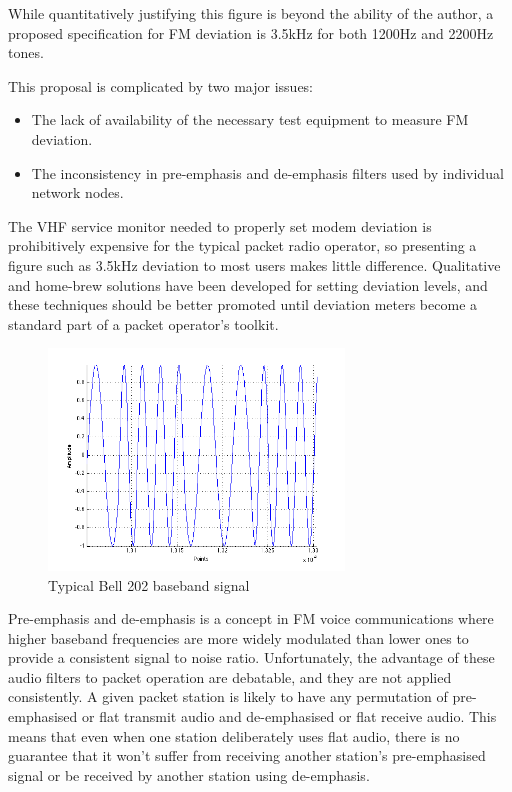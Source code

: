 \documentclass[12pt,letterpaper]{article}
\begin{document}
While quantitatively justifying this figure is beyond the ability of the
author, a proposed specification for FM deviation is 3.5kHz for both
1200Hz and 2200Hz tones\cite{millerinterview}.

This proposal is complicated by two major issues: 
\begin{itemize}
	\item The lack of availability of the necessary 
		test equipment to measure FM deviation.
	\item The inconsistency in pre-emphasis and de-emphasis filters
		used by individual network nodes.
\end{itemize}

The VHF service monitor needed to properly set modem deviation is prohibitively
expensive for the typical packet radio operator, so presenting a figure 
such as 3.5kHz deviation to most users makes little difference.
Qualitative and home-brew solutions have been developed
for setting deviation levels\cite{n8urdev},
and these techniques should be better promoted until 
deviation meters become a standard part of a packet operator's toolkit. 

\begin{figure}
	\centering
	\includegraphics[width=0.7\textwidth]{src/bell202sample}
	\caption{Typical Bell 202 baseband signal}
	\label{fig:bell202sample}
\end{figure}

Pre-emphasis and de-emphasis is a concept in FM voice communications where
higher baseband frequencies are more widely modulated than lower ones
to provide a consistent signal to noise ratio.
Unfortunately, the advantage of these audio filters to packet operation 
are debatable, and they are not applied consistently. A given packet 
station is likely to have any permutation of pre-emphasised or flat 
transmit audio and de-emphasised or flat receive audio.
This means that even when one station deliberately uses flat audio,
there is no guarantee that it won't suffer from receiving another
station's pre-emphasised signal or be received by another station using de-emphasis.
\end{document}

